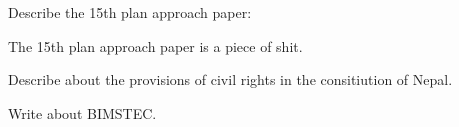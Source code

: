 
\begin{questions}


\question Describe the 15th plan approach paper:
  \begin{solution}
  The 15th plan approach paper is a piece of shit.
  \end{solution}
  
\question Describe about the provisions of civil rights in the consitiution of Nepal.

\question Write about BIMSTEC.
  \fillwithlines{2in}

\end{questions}
